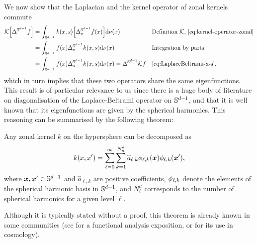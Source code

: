 We now show that the Laplacian and the kernel operator of zonal kernels commute
\begin{align}
    \mathcal{K} \left[\LaplaceBeltrami f\right] &= \int_{\dsphere} k(x, s) \left[\LaplaceBeltrami_x f(x)\right] \calcd{\nu(x)} && \text{Definition $\mathcal{K}$, \cref{eq:kernel-operator-zonal}}\\
    &= \int_{\dsphere} f(x) \LaplaceBeltrami_x k(x, s)  \calcd{\nu(x)} && \text{Integration by parts}\\
    &= \int_{\dsphere} f(x) \LaplaceBeltrami_s k(x, s)  \calcd{\nu(x)} = \LaplaceBeltrami \mathcal{K} f && \text{\cref{eq:LaplaceBeltrami-x-s}}.
\end{align}
which in turn implies that these two operators share the same eigenfunctions. This result is of particular relevance to us since there is a huge body of literature on diagonalisation of the Laplace-Beltrami operator on $\mathbb{S}^{d-1}$, and that it is well known that its eigenfunctions are given by the spherical harmonics. This reasoning can be summarised by the following theorem:
\begin{theorem}
Any zonal kernel $k$ on the hypersphere can be decomposed as
\begin{equation}
\label{eq:kernel-form}
    k(x, x') = \sum_{\ell=0}^{\infty} \sum_{k=1}^{N^d_n} \widehat{a}_{\ell, k} \phi_{\ell, k}(\bm{x}) \phi_{\ell, k}(\bm{x}'),
\end{equation}
where $\bm{x},\bm{x}' \in \mathbb{S}^{d-1}$ and $\widehat{a}_{\ell, k}$ are positive coefficients, $\phi_{\ell,k}$ denote the elements of the spherical harmonic basis in $\mathbb{S}^{d-1}$, and $N_\ell^d$ corresponds to the number of spherical harmonics for a given level $\ell$.
\end{theorem}
Although it is typically stated without a proof, this theorem is already known in some communities (see \citet{wendland2005} for a functional analysis exposition, or \citet{peacock1999cosmological} for its use in cosmology).



